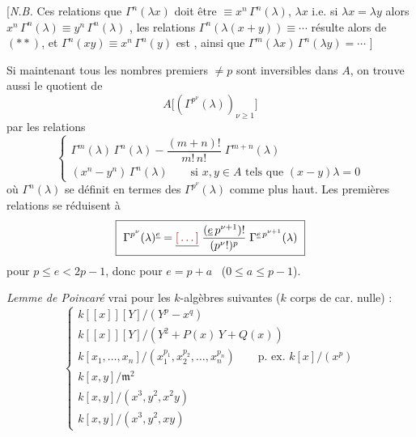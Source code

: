 \documentclass[11pt,a4paper]{article}
\begin{document}
[\emph{N.B.} Ces relations  que
$\Gamma^{n}(\lambda x)$ doit être $\equiv x^{n}\,\Gamma^{n}(\lambda)$,
\ill{} \struck{\ill{}} \ill{}  $\lambda x$
i.e. \struck{\ill{}} si $\lambda x = \lambda y$
alors $x^{n}\,\Gamma^{n}(\lambda) \equiv y^{n}\,\Gamma^{n}(\lambda)$
, les relations
$\Gamma^{n}(\lambda(x+y)) \equiv \cdots$ résulte alors de
$(**)$, et $\Gamma^{n}(xy) \equiv x^{n}\,\Gamma^{n}(y)$ est
, ainsi que $\Gamma^{m}(\lambda x)\,\Gamma^{n}(\lambda y) = \cdots$ ]

Si maintenant tous les nombres premiers $\neq p$ sont
inversibles dans $A$, on trouve aussi le quotient de
\[
  A\big[(\Gamma^{p^{\nu}}(\lambda))_{\nu \geqslant 1}\big]
\]
par les relations
\[
  \begin{cases}
    \Gamma^{m}(\lambda)\,\Gamma^{n}(\lambda) - \dfrac{(m+n)!}{m!\, n!}\; \Gamma^{m+n}(\lambda) \\[6pt]
    (x^{n} - y^{n})\,\Gamma^{n}(\lambda) \qquad \text{si } x, y \in A \text{ tels que } (x-y)\lambda = 0
  \end{cases}
\]
où $\Gamma^{n}(\lambda)$ se définit en termes
des $\Gamma^{p^{\nu}}(\lambda)$ comme plus haut. Les
premières relations se réduisent à
\[
  \boxed{\ \Gamma^{p^{\nu}}(\lambda)^{\uncertain{e}} = \struck{\ill{}}\; \frac{(\uncertain{e}\,p^{\nu+1})!}{(p^{\nu}!)^{p}}\; \Gamma^{\uncertain{e}\,p^{\nu+1}}(\lambda)\ }
\]
pour $p \leqslant e < 2p-1$, donc pour $e = p + a$ \ ($0 \leqslant a \leqslant p-1$).

\emph{Lemme de Poincaré} vrai pour les $k$-algèbres suivantes
($k$ corps de car. nulle) :
\[
  \begin{cases}
    k[[x]][Y] / (Y^{p} - x^{q}) \\
    k[[x]][Y] / (Y^{2} + P(x)\,Y + Q(x)) \\
    k[x_{1}, \ldots, x_{n}] / (x_{1}^{p_{1}}, x_{2}^{p_{2}}, \ldots, x_{n}^{p_{n}}) \qquad \text{p. ex. } k[x]/(x^{p}) \\
    k[x, y] / \mathfrak{m}^{2} \\
    k[x, y] / (x^{3}, y^{2}, x^{2}y) \\
    k[x, y] / (x^{3}, y^{2}, xy)
  \end{cases}
\]
\end{document}
